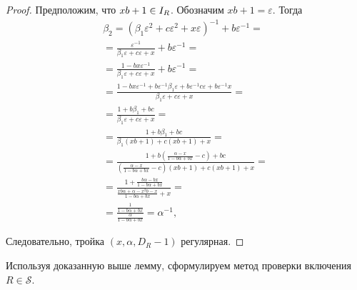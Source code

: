 \documentclass[_00_dissertation.tex]{subfiles}
\begin{document}
\begin{proof}
    Предположим, что $xb + 1 \in I_{R}$.
    Обозначим $xb + 1 = \varepsilon$.
    Тогда
    \begin{equation*}
        \begin{split}
            \beta_2 = \left(
                \beta_1 \varepsilon^2 + c\varepsilon^2 + x\varepsilon
            \right)^{-1} + b\varepsilon^{-1} = \\
            = \frac{\varepsilon^{-1}}{\beta_1 \varepsilon + c\varepsilon + x} + b\varepsilon^{-1} = \\
            = \frac{1 - bx\varepsilon^{-1}}{\beta_1 \varepsilon + c\varepsilon + x} + b\varepsilon^{-1} = \\
            = \frac{1 - bx\varepsilon^{-1} + b\varepsilon^{-1}\beta_1 \varepsilon + b\varepsilon^{-1}c\varepsilon + b\varepsilon^{-1}x}{\beta_1 \varepsilon + c\varepsilon + x} = \\
            = \frac{1 + b\beta_1 + bc}{\beta_1 \varepsilon + c\varepsilon + x} = \\
            = \frac{1 + b\beta_1 + bc}{\beta_1(xb + 1) + c(xb + 1) + x} = \\
            = \frac{
                1 + b\left(
                    \frac{\alpha - x}{1 - b\alpha + bx} - c
                \right) + bc
            }{
                \left(
                    \frac{\alpha - x}{1 - b\alpha + bx} - c
                \right)(xb + 1) + c(xb + 1) + x
            } = \\
            = \frac{
                1 + \frac{b\alpha - bx}{1 - b\alpha + bx}
            }{
                \frac{xb\alpha + \alpha - x^2b - x}{1 - b\alpha + bx} + x
            } = \\
            = \frac{
                \frac{1}{1 - b\alpha + bx}
            }{
                \frac{\alpha}{1 - b\alpha + bx}
            } = \alpha^{-1},
        \end{split}
    \end{equation*}
    
    Следовательно, тройка $(x, \alpha, D_R - 1)$ регулярная.
\end{proof}

Используя доказанную выше лемму, сформулируем метод проверки включения $R \in \mathcal{S}$.
\end{document}
